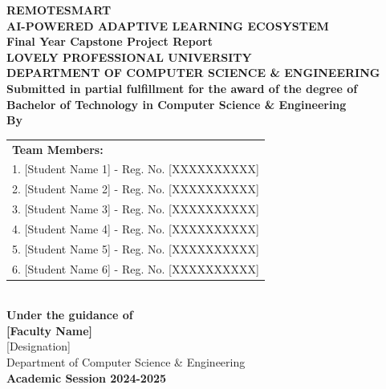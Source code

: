 \documentclass[12pt,a4paper]{report}
\begin{document}
\begin{titlepage}
    \centering
    \vspace*{2cm}

    {\Huge \textbf{REMOTESMART}}\\[0.5cm]
    {\Large \textbf{AI-POWERED ADAPTIVE LEARNING ECOSYSTEM}}\\[2cm]

    {\Large \textbf{Final Year Capstone Project Report}}\\[3cm]

    {\Large \textbf{LOVELY PROFESSIONAL UNIVERSITY}}\\[0.5cm]
    {\large \textbf{DEPARTMENT OF COMPUTER SCIENCE \& ENGINEERING}}\\[3cm]

    {\large \textbf{Submitted in partial fulfillment for the award of the degree of}}\\[0.5cm]
    {\Large \textbf{Bachelor of Technology in Computer Science \& Engineering}}\\[3cm]

    {\large \textbf{By}}\\[1cm]

    \begin{tabular}{l}
    \textbf{Team Members:}\\[0.5cm]
    1. [Student Name 1] - Reg. No. [XXXXXXXXXX]\\
    2. [Student Name 2] - Reg. No. [XXXXXXXXXX]\\
    3. [Student Name 3] - Reg. No. [XXXXXXXXXX]\\
    4. [Student Name 4] - Reg. No. [XXXXXXXXXX]\\
    5. [Student Name 5] - Reg. No. [XXXXXXXXXX]\\
    6. [Student Name 6] - Reg. No. [XXXXXXXXXX]
    \end{tabular}\\[3cm]

    {\large \textbf{Under the guidance of}}\\[1cm]

    {\large \textbf{[Faculty Name]}}\\[0.3cm]
    {\small [Designation]}\\[0.3cm]
    {\small Department of Computer Science \& Engineering}\\[3cm]

    {\large \textbf{Academic Session 2024-2025}}

    \vfill
\end{titlepage}
\end{document}
